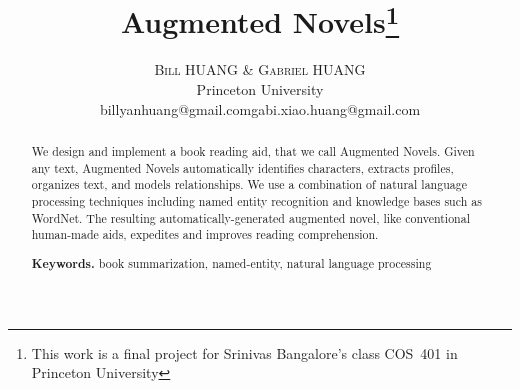 \documentclass[twoside]{article}
\title{\vspace{-15mm}\fontsize{24pt}{10pt}\selectfont\textbf{Augmented Novels\thanks{This work is a final project for Srinivas Bangalore's class COS~401 in Princeton University}} } %
\author{
\large
\textsc{Bill HUANG \& Gabriel HUANG}\\[2mm] %
\normalsize Princeton University \\ %
\normalsize{billyanhuang@gmail.com\quad gabi.xiao.huang@gmail.com} %
\vspace{-5mm}
}
\date{}
\begin{document}
\maketitle %

\thispagestyle{fancy} %


\begin{abstract}

We design and implement a book reading aid, that we call Augmented Novels. Given any text, Augmented Novels
automatically identifies characters, extracts profiles, organizes text, and models relationships. We use a combination of natural language processing techniques including named entity recognition and knowledge bases such as WordNet. The resulting automatically-generated augmented novel, like conventional human-made aids, expedites and improves reading comprehension.

\smallskip
\noindent\textbf{Keywords.} book summarization, named-entity, natural language processing

\end{abstract}

\end{document}
